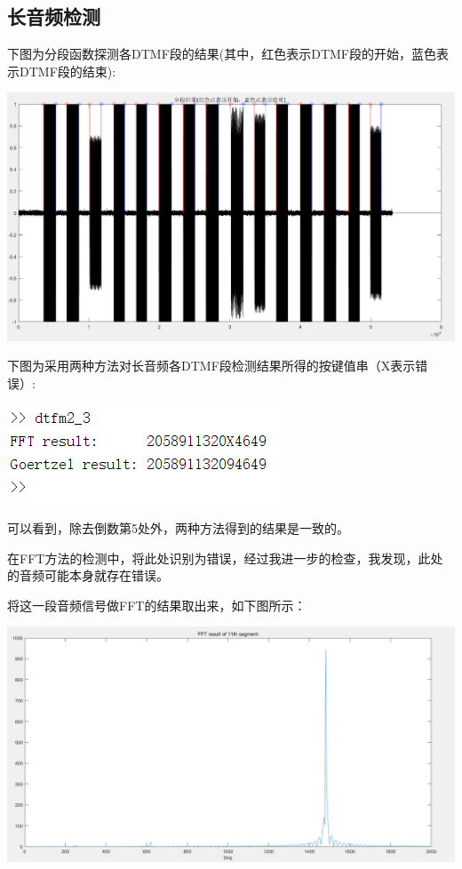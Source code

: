 \documentclass[10pt, a4paper]{article}
\begin{document}
\subsection{长音频检测}

下图为分段函数探测各DTMF段的结果(其中，红色表示DTMF段的开始，蓝色表示DTMF段的结束):

\centerline{\includegraphics[scale=0.45]{assets/12.png}}

下图为采用两种方法对长音频各DTMF段检测结果所得的按键值串（X表示错误）:

\centerline{\includegraphics[scale=1]{assets/13.png}}

可以看到，除去倒数第5处外，两种方法得到的结果是一致的。

在FFT方法的检测中，将此处识别为错误，经过我进一步的检查，我发现，此处的音频可能本身就存在错误。

将这一段音频信号做FFT的结果取出来，如下图所示：

\centerline{\includegraphics[scale=0.45]{assets/14.png}}
\end{document}
